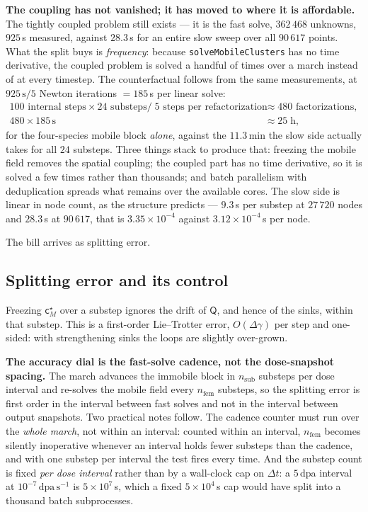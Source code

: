 \documentclass{article}
\newcommand{\spvec}[1]{\bm{\mathsf{#1}}}   %
\newcommand{\code}[1]{\texttt{#1}}
\begin{document}
\textbf{The coupling has not vanished; it has moved to where it is affordable.}
The tightly coupled problem still exists --- it is the fast solve, $362\,468$
unknowns, $925\,$s measured, against $28.3\,$s for an entire slow sweep over all
$90\,617$ points. What the split buys is \emph{frequency}: because
\code{solveMobileClusters} has no time derivative, the coupled problem is solved
a handful of times over a march instead of at every timestep. The counterfactual
follows from the same measurements, at $925\,\mathrm{s}/5$ Newton iterations
$=185\,$s per linear solve:
\begin{equation}
\begin{aligned}
100\text{ internal steps}\times24\text{ substeps}\big/\;5\text{ steps per refactorization}
&\approx480\text{ factorizations},\\[2pt]
480\times185\,\mathrm{s}&\approx25\;\mathrm{h},
\end{aligned}
\label{eq:counterfactual}
\end{equation}
for the four-species mobile block \emph{alone}, against the $11.3\,$min the slow
side actually takes for all $24$ substeps. Three things stack to produce that:
freezing the mobile field removes the spatial coupling; the coupled part has no
time derivative, so it is solved a few times rather than thousands; and batch
parallelism with deduplication spreads what remains over the available cores. The
slow side is linear in node count, as the structure predicts --- $9.3\,$s per
substep at $27\,720$ nodes and $28.3\,$s at $90\,617$, that is
$3.35\times10^{-4}$ against $3.12\times10^{-4}\,$s per node.

The bill arrives as splitting error.

\subsection{Splitting error and its control}
\label{sec:splitting}

Freezing $\spvec c^\star_M$ over a substep ignores the drift of $\spvec Q$, and
hence of the sinks, within that substep. This is a first-order Lie--Trotter
error, $O(\Delta\gamma)$ per step and one-sided: with strengthening sinks the
loops are slightly over-grown.

\textbf{The accuracy dial is the fast-solve cadence, not the dose-snapshot
spacing.} The march advances the immobile block in $n_{\mathrm{sub}}$ substeps
per dose interval and re-solves the mobile field every $n_{\mathrm{fem}}$
substeps, so the splitting error is first order in the interval between fast
solves and not in the interval between output snapshots. Two practical notes
follow. The cadence counter must run over the \emph{whole march}, not within an
interval: counted within an interval, $n_{\mathrm{fem}}$ becomes silently
inoperative whenever an interval holds fewer substeps than the cadence, and with
one substep per interval the test fires every time. And the substep count is
fixed \emph{per dose interval} rather than by a wall-clock cap on $\Delta t$: a
$5\,$dpa interval at $10^{-7}\,\mathrm{dpa\,s^{-1}}$ is $5\times10^{7}\,$s, which
a fixed $5\times10^{4}\,$s cap would have split into a thousand batch
subprocesses.
\end{document}
